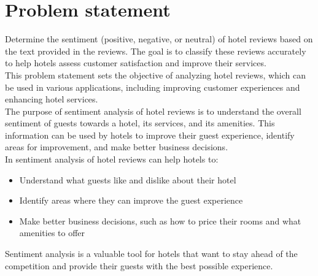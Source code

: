 \documentclass[a4paper, 12pt]{report}
\begin{document}
\section{Problem statement}
Determine the sentiment (positive, negative, or neutral) of hotel reviews based on the text provided in the reviews. The goal is to classify these reviews accurately to help hotels assess customer satisfaction and improve their services.
\\
This problem statement sets the objective of analyzing hotel reviews, which can be used in various applications, including improving customer experiences and enhancing hotel services.
\\
The purpose of sentiment analysis of hotel reviews is to understand the overall sentiment of guests towards a hotel, its services, and its amenities. This information can be used by hotels to improve their guest experience, identify areas for improvement, and make better business decisions.\\
In sentiment analysis of hotel reviews can help hotels to:
\begin{itemize}
	\item Understand what guests like and dislike about their hotel
	\item Identify areas where they can improve the guest experience
	\item Make better business decisions, such as how to price their rooms and what amenities to offer
\end{itemize}
Sentiment analysis is a valuable tool for hotels that want to stay ahead of the competition and provide their guests with the best possible experience.
\end{document}
